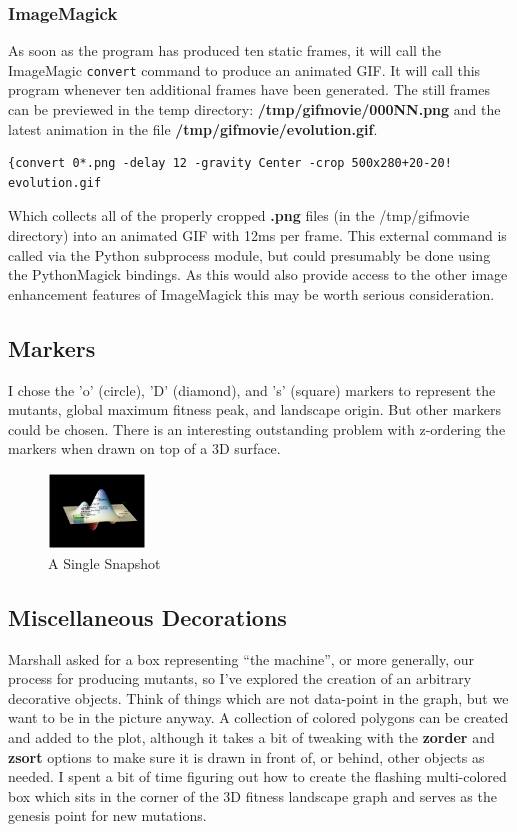 \documentclass[10pt,letterpaper]{article}
\begin{document}
\subsubsection*{ImageMagick}
As soon as the program has produced ten static frames, it will call the ImageMagic\cite{imagemagick} {\tt convert} command to produce an animated GIF. It will call this program whenever ten additional frames have been generated. The still frames can be previewed in the temp directory: {\bf /tmp/gifmovie/000NN.png} and the latest animation in the file {\bf /tmp/gifmovie/evolution.gif}.
\begin{lstlisting}
{convert 0*.png -delay 12 -gravity Center -crop 500x280+20-20! evolution.gif
\end{lstlisting}
Which collects all of the properly cropped {\bf .png} files (in the /tmp/gifmovie directory) into an animated GIF with 12ms per frame.  This external command is called via the Python subprocess module, but could presumably be done using the PythonMagick bindings.  As this would also provide access to the other image enhancement features of ImageMagick this may be worth serious consideration.

\subsection*{Markers}
I chose the 'o' (circle), 'D' (diamond), and 's' (square) markers to represent the mutants, global maximum fitness peak, and landscape origin. But other markers could be chosen. There is an interesting outstanding problem with z-ordering the markers when drawn on top of a 3D surface.

\begin{figure}
\includegraphics[width=0.23\textwidth,scale=0.2]{fitness.png}
\caption{\label{fig:reticules}A Single Snapshot}
\end{figure}

\subsection*{Miscellaneous Decorations}
Marshall asked for a box representing ``the machine'', or more generally, our process for producing mutants, so I've explored the creation of an arbitrary decorative objects.  Think of things which are not data-point in the graph, but we want to be in the picture anyway.   A collection of colored polygons can be created and added to the plot, although it takes a bit of tweaking with the {\bf zorder} and {\bf zsort} options to make sure it is drawn in front of, or behind, other objects as needed.  I spent a bit of time figuring out how to create the flashing multi-colored box which sits in the corner of the 3D fitness landscape graph and serves as the genesis point for new mutations.
\end{document}
